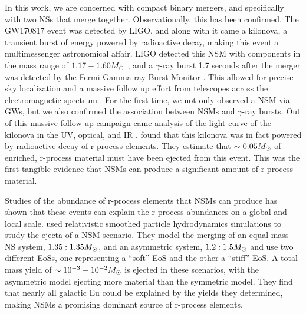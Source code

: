 \documentclass[fleqn,usenatbib]{mnras}
\begin{document}
In this work, we are concerned with compact binary mergers, and specifically with two NSs that merge together. Observationally, this has been confirmed. The GW170817 event was detected by LIGO, and along with it came a kilonova, a transient burst of energy powered by radioactive decay, making this event a multimessenger astronomical affair. LIGO detected this NSM with components in the mass range of $1.17 - 1.60 \Ms$ \citep{Abbott17}, and a $\gamma$-ray burst 1.7 seconds after the merger was detected by the Fermi Gamma-ray Burst Monitor \citep{Goldstein17}. This allowed for precise sky localization and a massive follow up effort from telescopes across the electromagnetic spectrum \citep[see][for an extensive review of this follow-up]{Abbott17a}. For the first time, we not only observed a NSM via GWs, but we also confirmed the association between NSMs and $\gamma$-ray bursts. Out of this massive follow-up campaign came analysis of the light curve of the kilonova in the UV, optical, and IR \citep{Drout17, Pian17}. \citet{Drout17} found that this kilonova was in fact powered by radioactive decay of r-process elements. They estimate that $\sim 0.05 \Ms$ of enriched, r-process material must have been ejected from this event. This was the first tangible evidence that NSMs can produce a significant amount of r-process material.

Studies of the abundance of r-process elements that NSMs can produce has shown that these events can explain the r-process abundances on a global and local scale. \citet{Goriely11} used relativistic smoothed particle hydrodynamics simulations to study the ejecta of a NSM scenario. They model the merging of an equal mass NS system, $1.35:1.35 \Ms$, and an asymmetric system, $1.2:1.5 \Ms$ and use two different EoSs, one representing a ``soft'' EoS and the other a ``stiff'' EoS. A total mass yield of $\sim 10^{-3} - 10^{-2} \Ms$ is ejected in these scenarios, with the asymmetric model ejecting more material than the symmetric model. They find that nearly all galactic Eu could be explained by the yields they determined, making NSMs a promising dominant source of r-process elements. 
\end{document}
